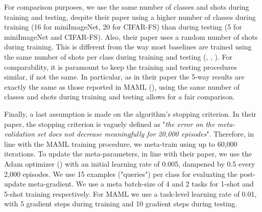 For comparison purposes, we use the same number of classes and shots during training and testing, despite their paper using a higher number of classes during training (16 for miniImageNet, 20 for \textsc{CIFAR-FS}) than during testing (5 for miniImageNet and \textsc{CIFAR-FS}). Also, their paper uses a random number of shots during training. This is different from the way most baselines are trained using the same number of shots per class during training and testing (\citet{MAML}, \citet{reptile}, \citet{vinyals}). For comparability, it is paramount to keep the training and testing procedures similar, if not the same. In particular, as in their paper the 5-way results are exactly the same as those reported in MAML (\citet{finn}), using the same number of classes and shots during training and testing allows for a fair comparison.


Finally, a last assumption is made on the algorithm's stopping criterion. In their paper, the stopping criterion is vaguely defined as "\textit{the error on the meta-validation set does not decrease meaningfully for 20,000 episodes}". Therefore, in line with the MAML training procedure, we meta-train using up to 60,000 iterations. To update the meta-parameters, in line with their paper, we use the Adam optimizer (\citet{adam}) with an initial learning rate of 0.005, dampened by 0.5 every 2,000 episodes. We use 15 examples ("queries") per class for evaluating the post-update meta-gradient. We use a meta batch-size of 4 and 2 tasks for 1-shot and 5-shot training respectively. For MAML we use a task-level learning rate of 0.01, with 5 gradient steps during training and 10 gradient steps during testing.


